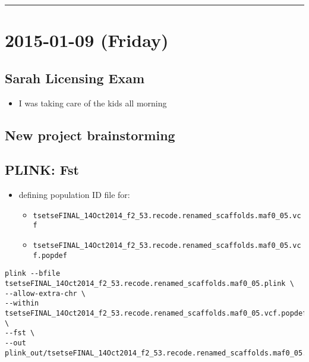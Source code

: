 \documentclass[letterpaper]{scrartcl}
\begin{document}
\begin{center}\rule{0.5\linewidth}{\linethickness}\end{center}

\section{2015-01-09 (Friday)}\label{friday-1}

\subsection{Sarah Licensing Exam}\label{sarah-licensing-exam}

\begin{itemize}
\itemsep1pt\parskip0pt
\item
  I was taking care of the kids all morning
\end{itemize}

\subsection{New project brainstorming}\label{new-project-brainstorming}

\subsection{PLINK: Fst}\label{plink-fst}

\begin{itemize}
\itemsep1pt\parskip0pt
\item
  defining population ID file for:

  \begin{itemize}
  \itemsep1pt\parskip0pt
  \item
    \texttt{tsetseFINAL\_14Oct2014\_f2\_53.recode.renamed\_scaffolds.maf0\_05.vcf}
  \item
    \texttt{tsetseFINAL\_14Oct2014\_f2\_53.recode.renamed\_scaffolds.maf0\_05.vcf.popdef}
  \end{itemize}
\end{itemize}

\begin{verbatim}
plink --bfile tsetseFINAL_14Oct2014_f2_53.recode.renamed_scaffolds.maf0_05.plink \
--allow-extra-chr \
--within tsetseFINAL_14Oct2014_f2_53.recode.renamed_scaffolds.maf0_05.vcf.popdef \
--fst \
--out plink_out/tsetseFINAL_14Oct2014_f2_53.recode.renamed_scaffolds.maf0_05.vcf/fst/out
\end{verbatim}
\end{document}
